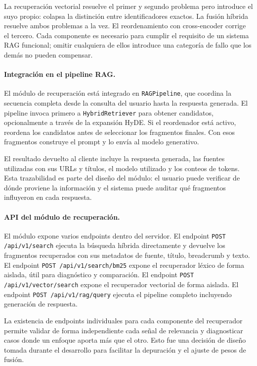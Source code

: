 \documentclass[11pt]{article}
\begin{document}
La recuperación vectorial resuelve el primer y segundo problema pero introduce el suyo propio:
colapsa la distinción entre identificadores exactos. La fusión híbrida resuelve ambos problemas
a la vez. El reordenamiento con cross-encoder corrige el tercero. Cada componente es necesario
para cumplir el requisito de un sistema RAG funcional; omitir cualquiera de ellos introduce
una categoría de fallo que los demás no pueden compensar.

\paragraph{Integración en el pipeline RAG.}
El módulo de recuperación está integrado en \texttt{RAGPipeline}, que coordina la secuencia
completa desde la consulta del usuario hasta la respuesta generada. El pipeline invoca primero
a \texttt{HybridRetriever} para obtener candidatos, opcionalmente a través de la expansión HyDE.
Si el reordenador está activo, reordena los candidatos antes de seleccionar los fragmentos
finales. Con esos fragmentos construye el prompt y lo envía al modelo generativo.

El resultado devuelto al cliente incluye la respuesta generada, las fuentes utilizadas con sus
URLs y títulos, el modelo utilizado y los conteos de tokens. Esta trazabilidad es parte del
diseño del módulo: el usuario puede verificar de dónde proviene la información y el sistema
puede auditar qué fragmentos influyeron en cada respuesta.

\paragraph{API del módulo de recuperación.}
El módulo expone varios endpoints dentro del servidor. El endpoint
\texttt{POST /api/v1/search} ejecuta la búsqueda híbrida directamente y devuelve los fragmentos
recuperados con sus metadatos de fuente, título, breadcrumb y texto. El endpoint
\texttt{POST /api/v1/search/bm25} expone el recuperador léxico de forma aislada, útil para
diagnóstico y comparación. El endpoint \texttt{POST /api/v1/vector/search} expone el recuperador
vectorial de forma aislada. El endpoint \texttt{POST /api/v1/rag/query} ejecuta el pipeline
completo incluyendo generación de respuesta.

La existencia de endpoints individuales para cada componente del recuperador permite validar de
forma independiente cada señal de relevancia y diagnosticar casos donde un enfoque aporta más
que el otro. Esto fue una decisión de diseño tomada durante el desarrollo para facilitar la
depuración y el ajuste de pesos de fusión.
\end{document}
